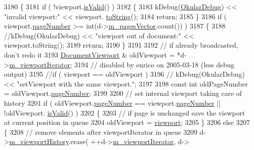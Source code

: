 \begin{DoxyCode}
3180 \{
3181     \textcolor{keywordflow}{if} ( !viewport.\hyperlink{classOkular_1_1DocumentViewport_a13161b17f2d0b68bf033955f81d41584}{isValid}() )
3182     \{
3183         kDebug(\hyperlink{debug__p_8h_af16c6e32a95969dd0605d792ec9807c7}{OkularDebug}) << \textcolor{stringliteral}{"invalid viewport:"} << viewport.
      \hyperlink{classOkular_1_1DocumentViewport_a77e42e0c9502b91085cd25f845ecafa0}{toString}();
3184         \textcolor{keywordflow}{return};
3185     \}
3186     \textcolor{keywordflow}{if} ( viewport.\hyperlink{classOkular_1_1DocumentViewport_a122674d4a493e79b1aa5fd5c00e81c93}{pageNumber} >= \textcolor{keywordtype}{int}(d->\hyperlink{classOkular_1_1DocumentPrivate_a73b852d9a73ffe8061b66dbf9b290f17}{m\_pagesVector}.count()) )
3187     \{
3188         \textcolor{comment}{//kDebug(OkularDebug) << "viewport out of document:" << viewport.toString();}
3189         \textcolor{keywordflow}{return};
3190     \}
3191 
3192     \textcolor{comment}{// if already broadcasted, don't redo it}
3193     \hyperlink{classOkular_1_1DocumentViewport}{DocumentViewport} & oldViewport = *d->\hyperlink{classOkular_1_1DocumentPrivate_a81a62e8d31d0e7873cd5f5c1590fa2fc}{m\_viewportIterator};
3194     \textcolor{comment}{// disabled by enrico on 2005-03-18 (less debug output)}
3195     \textcolor{comment}{//if ( viewport == oldViewport )}
3196     \textcolor{comment}{//    kDebug(OkularDebug) << "setViewport with the same viewport.";}
3197 
3198     \textcolor{keyword}{const} \textcolor{keywordtype}{int} oldPageNumber = oldViewport.\hyperlink{classOkular_1_1DocumentViewport_a122674d4a493e79b1aa5fd5c00e81c93}{pageNumber};
3199 
3200     \textcolor{comment}{// set internal viewport taking care of history}
3201     \textcolor{keywordflow}{if} ( oldViewport.\hyperlink{classOkular_1_1DocumentViewport_a122674d4a493e79b1aa5fd5c00e81c93}{pageNumber} == viewport.\hyperlink{classOkular_1_1DocumentViewport_a122674d4a493e79b1aa5fd5c00e81c93}{pageNumber} || !oldViewport.
      \hyperlink{classOkular_1_1DocumentViewport_a13161b17f2d0b68bf033955f81d41584}{isValid}() )
3202     \{
3203         \textcolor{comment}{// if page is unchanged save the viewport at current position in queue}
3204         oldViewport = \hyperlink{classOkular_1_1Document_abb8738de0a53aa4a9f552de0e1e749f8}{viewport};
3205     \}
3206     \textcolor{keywordflow}{else}
3207     \{
3208         \textcolor{comment}{// remove elements after viewportIterator in queue}
3209         d->\hyperlink{classOkular_1_1DocumentPrivate_a47ead6a6650c01fb91ac512e55320f87}{m\_viewportHistory}.erase( ++d->\hyperlink{classOkular_1_1DocumentPrivate_a81a62e8d31d0e7873cd5f5c1590fa2fc}{m\_viewportIterator}, d->

\end{DoxyCode}
